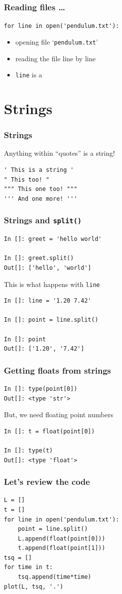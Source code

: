 \documentclass[14pt,compress]{beamer}
\newcounter{time}
\newcommand{\typ}[1]{\lstinline{#1}}
\newcommand{\kwrd}[1]{ \texttt{\textbf{\color{blue}{#1}}}  }
\begin{document}
\begin{frame}[fragile]
  \frametitle{Reading files \ldots}
\typ{for line in open('pendulum.txt'):}
\begin{itemize}
\item opening file `\typ{pendulum.txt}'
\item reading the file line by line
\item \typ{line} is a \kwrd{string}
\end{itemize}
\end{frame}

\section{Strings}
\begin{frame}[fragile]
\frametitle{Strings}
Anything within ``quotes'' is a string!
\begin{lstlisting}
' This is a string '  
" This too! "
""" This one too! """
''' And one more! '''
\end{lstlisting}
\end{frame}

\begin{frame}[fragile]
\frametitle{Strings and \typ{split()}}
  \begin{lstlisting}
In []: greet = 'hello world'

In []: greet.split()
Out[]: ['hello', 'world']
  \end{lstlisting}
This is what happens with \typ{line}
  \begin{lstlisting}
In []: line = '1.20 7.42'

In []: point = line.split()

In []: point
Out[]: ['1.20', '7.42']
  \end{lstlisting}
\end{frame}

\begin{frame}[fragile]
\frametitle{Getting floats from strings}
  \begin{lstlisting}
In []: type(point[0])
Out[]: <type 'str'>
  \end{lstlisting}
But, we need floating point numbers
  \begin{lstlisting}
In []: t = float(point[0])

In []: type(t)
Out[]: <type 'float'>
  \end{lstlisting}
\end{frame}

\begin{frame}[fragile]
\frametitle{Let's review the code}
\begin{lstlisting}
L = []
t = []
for line in open('pendulum.txt'):
    point = line.split()
    L.append(float(point[0]))
    t.append(float(point[1]))
tsq = []
for time in t:
    tsq.append(time*time)
plot(L, tsq, '.')
\end{lstlisting}
\end{frame}
\end{document}
